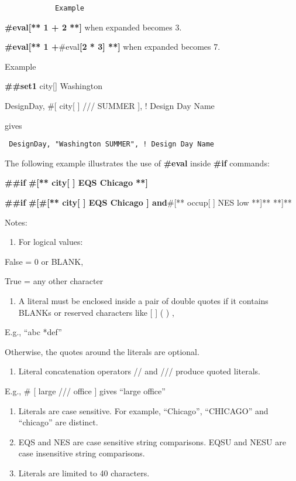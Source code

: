 \begin{lstlisting}
            Example
\end{lstlisting}

\textbf{\#eval{[}** 1 + 2 **{]}} when expanded becomes 3.

\textbf{\#eval{[}** 1 +}\#eval\textbf{{[}2 * 3{]} **{]}} when expanded becomes 7.

Example

\textbf{\#\#set1} city{[}{]} Washington

DesignDay, \#{[} city{[} {]} /// SUMMER {]}, ! Design Day Name

gives

\begin{lstlisting}
 DesignDay, "Washington SUMMER", ! Design Day Name
\end{lstlisting}

The following example illustrates the use of \textbf{\#eval} inside \textbf{\#if} commands:

\textbf{\#\#if} \textbf{\#{[}** city{[} {]} EQS Chicago **{]}}

\textbf{\#\#if} \textbf{\#{[}\#{[}** city{[} {]} EQS Chicago {]} and}\#{[}** occup{[} {]} NES low **{]}** **{]}**

Notes:

\begin{enumerate}
\def\labelenumi{\arabic{enumi}.}
\tightlist
\item
  For logical values:
\end{enumerate}

False = 0 or BLANK,

True = any other character

\begin{enumerate}
\def\labelenumi{\arabic{enumi}.}
\setcounter{enumi}{1}
\tightlist
\item
  A literal must be enclosed inside a pair of double quotes if it contains BLANKs or reserved characters like {[} {]} ( ) ,
\end{enumerate}

E.g., ``abc *def''

Otherwise, the quotes around the literals are optional.

\begin{enumerate}
\def\labelenumi{\arabic{enumi}.}
\setcounter{enumi}{2}
\tightlist
\item
  Literal concatenation operators // and /// produce quoted literals.
\end{enumerate}

E.g., \# {[} large /// office {]} gives ``large office''

\begin{enumerate}
\def\labelenumi{\arabic{enumi}.}
\setcounter{enumi}{3}
\item
  Literals are case sensitive. For example, ``Chicago'', ``CHICAGO'' and ``chicago'' are distinct.
\item
  EQS and NES are case sensitive string comparisons. EQSU and NESU are case insensitive string comparisons.
\item
  Literals are limited to 40 characters.
\end{enumerate}

